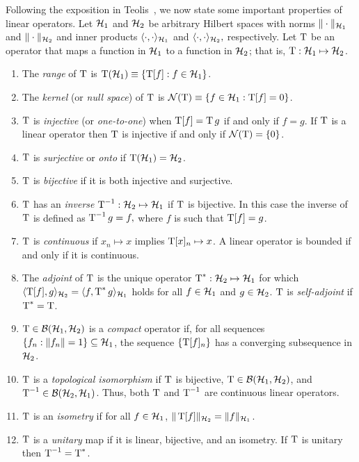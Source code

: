 Following the exposition in Teolis~\cite{Teolis:1998}, we now
state some important properties of linear operators.
Let $\mathcal{H}_1$ and $\mathcal{H}_2$ be arbitrary Hilbert spaces with norms 
$\|\cdot\|_{\mathcal{H}_1}$ and $\|\cdot\|_{\mathcal{H}_2}$ and inner products
$\langle \cdot,\cdot\rangle_{\mathcal{H}_1}$ and
$\langle \cdot,\cdot\rangle_{\mathcal{H}_2},$ respectively.
Let $\operatorname{T}$ be an operator that maps a function in $\mathcal{H}_1$ to a function
in $\mathcal{H}_2$; that is, $\operatorname{T}: \mathcal{H}_1 \mapsto \mathcal{H}_2$.
\begin{enumerate}
\item The \emph{range} of $\operatorname{T}$ is 
$\operatorname{T} (\mathcal{H}_1) \equiv \{\operatorname{T}[f]: f\in \mathcal{H}_1\}$.
\item The \emph{kernel} (or \emph{null space}) of $\operatorname{T}$ is 
$\mathcal{N}(\operatorname{T} ) \equiv \{f \in \mathcal{H}_1: \operatorname{T}[f] = 0\}$.
\item $\operatorname{T} $ is \emph{injective} (or \emph{one-to-one}) when $\operatorname{T}[f] = \operatorname{T} g$ if and
only if $f = g$.  If $\operatorname{T} $ is a linear operator then $\operatorname{T} $ is injective if
and only if $\mathcal{N}(\operatorname{T} ) = \{0\}$.
\item $\operatorname{T} $ is \emph{surjective} or \emph{onto} if $\operatorname{T} (\mathcal{H}_1) = \mathcal{H}_2$.
\item $\operatorname{T} $ is \emph{bijective} if it is both injective and surjective.
\item $\operatorname{T} $ has an \emph{inverse} $\operatorname{T} ^{-1}: \mathcal{H}_2 \mapsto \mathcal{H}_1$ if $\operatorname{T} $ is
bijective.  In this case the inverse of $\operatorname{T} $ is defined as $\operatorname{T} ^{-1}g =
f,$ where $f$ is such that $\operatorname{T}[f]=g$.
\item $\operatorname{T} $ is \emph{continuous} if $x_n \mapsto x$ implies $\operatorname{T}[x]_n \mapsto x$.
A linear operator is bounded if and only if it is continuous.
\item The \emph{adjoint} of $\operatorname{T} $ is the unique operator 
$\operatorname{T} ^*:\mathcal{H}_2 \mapsto \mathcal{H}_1$ for which
$\langle \operatorname{T}[f],g\rangle_{\mathcal{H}_2} = \langle f,\operatorname{T} ^*g\rangle_{\mathcal{H}_1}$ holds for all
$f\in \mathcal{H}_1$ and $g \in \mathcal{H}_2$.  $\operatorname{T} $ is \emph{self-adjoint} if
$\operatorname{T} ^*=\operatorname{T} $.
\item $\operatorname{T} \in \mathcal{B}(\mathcal{H}_1,\mathcal{H}_2)$ is a \emph{compact} operator if, for all
sequences $\{f_n: \|f_n\| = 1\} \subseteq \mathcal{H}_1$, the sequence
$\{\operatorname{T}[f]_n\}$ has a converging subsequence in $\mathcal{H}_2$.
\item $\operatorname{T} $ is a \emph{topological isomorphism} if $\operatorname{T} $ is bijective,
$\operatorname{T} \in \mathcal{B}(\mathcal{H}_1,\mathcal{H}_2)$, and $\operatorname{T} ^{-1} \in \mathcal{B}(\mathcal{H}_2,\mathcal{H}_1)$.  Thus, both $\operatorname{T} $
and $\operatorname{T} ^{-1}$ are continuous linear operators.
\item $\operatorname{T} $ is an \emph{isometry} if for all $f \in \mathcal{H}_1$,
$\|\operatorname{T}[f]\|_{\mathcal{H}_2} = \|f\|_{\mathcal{H}_1}$.
\item $\operatorname{T} $ is a \emph{unitary} map if it is linear, bijective, and an
isometry.  If $\operatorname{T} $ is unitary then $\operatorname{T} ^{-1} = \operatorname{T} ^*$.
\end{enumerate}

